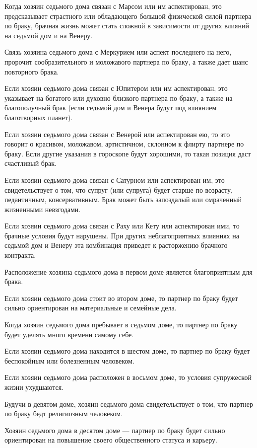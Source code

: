 Когда хозяин седьмого дома связан с Марсом или им аспектирован, это предсказывает страстного или обладающего большой физической силой партнера по браку, брачная жизнь может стать сложной в зависимости от других влияний на седьмой дом и на Венеру.

Связь хозяина седьмого дома с Меркурием или аспект последнего на него, пророчит сообразительного и моложавого партнера по браку, а также дает шанс повторного брака.

Если хозяин седьмого дома связан с Юпитером или им аспектирован, это указывает на богатого или духовно близкого партнера по браку, а также на благополучный брак (если седьмой дом и Венера будут под влиянием благотворных планет).

Если хозяин седьмого дома связан с Венерой или аспектирован ею, то это говорит о красивом, моложавом, артистичном, склонном к флирту партнере по браку. Если другие указания в гороскопе будут хорошими, то такая позиция даст счастливый брак.

Если хозяин седьмого дома связан с Сатурном или аспектирован им, это свидетельствует о том, что супруг (или супруга) будет старше по возрасту, педантичным, консервативным. Брак может быть запоздалый или омраченный жизненными невзгодами.

Если хозяин седьмого дома связан с Раху или Кету или аспектирован ими, то брачные условия будут нарушены. При других неблагоприятных влияниях на седьмой дом и Венеру эта комбинация приведет к расторжению брачного контракта.

Расположение хозяина седьмого дома в первом доме является благоприятным для брака.

Если хозяин седьмого дома стоит во втором доме, то партнер по браку будет сильно ориентирован на материальные и семейные дела.

Когда хозяин седьмого дома пребывает в седьмом доме, то партнер по браку будет уделять много времени самому себе.

Если хозяин седьмого дома находится в шестом доме, то партнер по браку будет беспокойным или болезненным человеком.

Если хозяин седьмого дома расположен в восьмом доме, то условия супружеской жизни ухудшаются.

Будучи в девятом доме, хозяин седьмого дома свидетельствует о том, что партнер по браку бедт религиозным человеком.

Хозяин седьмого дома в десятом доме --- партнер по браку будет сильно ориентирован на повышение своего общественного статуса и карьеру.

